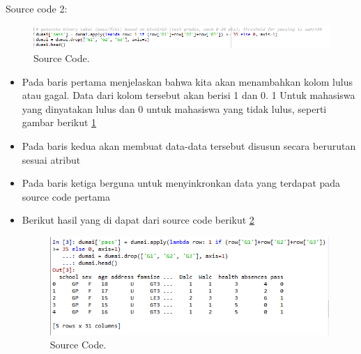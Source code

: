 Source code 2:
		\begin{figure}[ht]
		\centerline{\includegraphics[width=1\textwidth]{figures/im/imQ2.png}}
		\caption{Source Code.}
		\label{duaQ}
		\end{figure}
\begin{itemize}
\item Pada baris pertama menjelaskan bahwa kita akan menambahkan kolom lulus atau gagal. Data dari kolom tersebut akan berisi 1 dan 0. 1 Untuk mahasiswa yang dinyatakan lulus dan 0 untuk mahasiswa yang tidak lulus, seperti gambar berikut \ref{duaQ}
\item Pada baris kedua akan membuat data-data tersebut disusun secara berurutan sesuai atribut
\item Pada baris ketiga berguna untuk menyinkronkan data yang terdapat pada source code pertama
\item Berikut hasil yang di dapat dari source code berikut \ref{duaC}
		\begin{figure}[ht]
		\centerline{\includegraphics[width=1\textwidth]{figures/im/imCode2.png}}
		\caption{Source Code.}
		\label{duaC}
		\end{figure}
\end{itemize}

